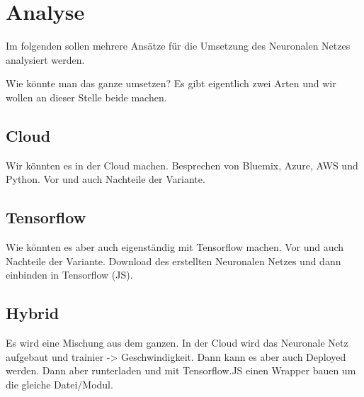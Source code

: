 \section{Analyse}
Im folgenden sollen mehrere Ansätze für die Umsetzung des Neuronalen Netzes analysiert werden.

Wie könnte man das ganze umsetzen? Es gibt eigentlich zwei Arten und wir wollen an dieser Stelle beide machen.

\subsection{Cloud}
Wir könnten es in der Cloud machen. Besprechen von Bluemix, Azure, AWS und Python. Vor und auch Nachteile der Variante.

\subsection{Tensorflow}
Wie könnten es aber auch eigenständig mit Tensorflow machen. Vor und auch Nachteile der Variante. Download des erstellten
Neuronalen Netzes und dann einbinden in Tensorflow (JS).

\subsection{Hybrid}
Es wird eine Mischung aus dem ganzen. In der Cloud wird das Neuronale Netz aufgebaut und trainier -> Geschwindigkeit.
Dann kann es aber auch Deployed werden. Dann aber runterladen und mit Tensorflow.JS einen Wrapper bauen um die gleiche
Datei/Modul.